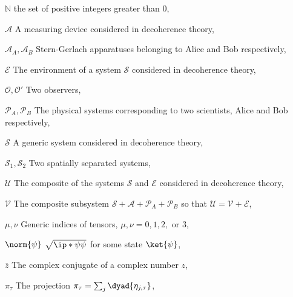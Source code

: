 \begin{thenomenclature}
  \item [{$\mathbb{N}$}]\begingroup  the set of positive integers greater than $0$, \nomrefpage{}
  \item [{$\mathcal{A}$}]\begingroup A measuring device considered in decoherence theory, \nomrefpage{}
  \item [{$\mathcal{A}_A, \mathcal{A}_B$}]\begingroup Stern-Gerlach apparatuses belonging to Alice and Bob respectively,  \nomrefpage{}
  \item [{$\mathcal{E}$}]\begingroup The environment of a system $\mathcal{S}$ considered in decoherence theory, \nomrefpage{}
  \item [{$\mathcal{O}, \mathcal{O}'$}]\begingroup Two observers, \nomrefpage{}
  \item [{$\mathcal{P}_A,\mathcal{P}_B$}]\begingroup The physical systems corresponding to two scientists, Alice and Bob respectively, \nomrefpage{}
  \item [{$\mathcal{S}$}]\begingroup A generic system considered in decoherence theory, \nomrefpage{}
  \item [{$\mathcal{S}_1, \mathcal{S}_2$}]\begingroup Two spatially separated systems, \nomrefpage{}
  \item [{$\mathcal{U}$}]\begingroup The composite of the systems $\mathcal{S}$ and $\mathcal{E}$ considered in decoherence theory, \nomrefpage{}
  \item [{$\mathcal{V}$}]\begingroup The composite subsystem $\mathcal{S}+\mathcal{A}+\mathcal{P}_A+\mathcal{P}_B$ so that $\mathcal{U}=\mathcal{V}+\mathcal{E}$, \nomrefpage{}
  \item [{$\mu, \nu$}]\begingroup Generic indices of tensors, $\mu, \nu=0,1,2,$ or $3$, \nomrefpage{}
  \item [{$\norm{\psi}$}]\begingroup $\sqrt{\ip*{\psi}{\psi}}$ for some state $\ket{\psi}$, \nomrefpage{}
  \item [{$\overline {z}$}]\begingroup The complex conjugate of a complex number $z$, \nomrefpage {}
  \item [{$\pi_\tau$}]\begingroup The projection $\pi_\tau=\sum_j\dyad{\eta_{j,\tau}}$, \nomrefpage{}

\end{thenomenclature}
